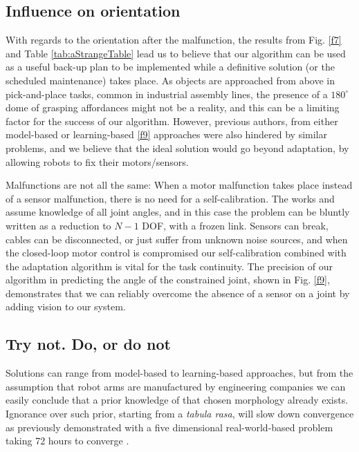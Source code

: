\documentclass{ieeeaccess}
\newcommand{\degree}{^\circ}
\begin{document}
\subsection{Influence on orientation}

With regards to the orientation after the malfunction, the results from Fig. \ref{f7} and Table \ref{tab:aStrangeTable} lead us to believe that our algorithm can be used as a useful back-up plan to be implemented while a definitive solution (or the scheduled maintenance) takes place. As objects are approached from above in pick-and-place tasks, common in industrial assembly lines, the presence of a $180\degree$ dome of grasping affordances might not be a reality, and this can be a limiting factor for the success of our algorithm. However, previous authors, from either model-based \cite{7832455} or learning-based \cite{goel2005analyzing} \cite{cully2015robots} \ref{f9} approaches were also hindered by similar problems, and we believe that the ideal solution would go beyond adaptation, by allowing robots to fix their motors/sensors. 

Malfunctions are not all the same: When a motor malfunction takes place instead of a sensor malfunction, there is no need for a self-calibration. The works \cite{goel2005analyzing} and \cite{7832455} assume knowledge of all joint angles, and in this case the problem can be bluntly written as a reduction to $N-1$ DOF, with a frozen link. Sensors can break, cables can be disconnected, or just suffer from unknown noise sources, and when the closed-loop motor control is compromised our self-calibration combined with the adaptation algorithm is vital for the task continuity. The precision of our algorithm in predicting the angle of the constrained joint, shown in Fig. \ref{f9}, demonstrates that we can reliably overcome the absence of a sensor on a joint by adding vision to our system.

\subsection{Try not. Do, or do not}

Solutions can range from model-based to learning-based approaches, but from the assumption that robot arms are manufactured by engineering companies we can easily conclude that a prior knowledge of that chosen morphology already exists. Ignorance over such prior, starting from a \emph{tabula rasa}, will slow down convergence as previously demonstrated with a five dimensional real-world-based problem taking 72 hours to converge \cite{rosendo2017trade}. 
\end{document}
